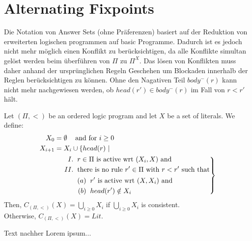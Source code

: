 \section{Alternating Fixpoints}

Die Notation von Answer Sets (ohne Präferenzen) basiert auf
der Reduktion von erweiterten logischen programmen auf basic Programme.
Dadurch ist es jedoch nicht mehr möglich einen Konflikt zu berücksichtigen,
da alle Konflikte simultan gelöst werden beim überführen von $\Pi$ zu $\Pi^X$.
Das lösen von Konflikten muss daher anhand der ursprünglichen Regeln Geschehen
um Blockaden innerhalb der Reglen berücksichtigen zu können.
Ohne den Nagativen Teil $body^-(r)$ kann nicht mehr nachgewiesen werden, ob
$head(r') \in body^-(r)$ im Fall von $r < r'$ hält.

\begin{definition}
  Let $(\Pi, <)$ be an ordered logic program and let $X$ be a set of literals.
  We define:\\
  \begin{equation*}
    \begin{split}
      X_0 & = \emptyset\hspace*{0.3cm} \text{~and for~} i \geq 0 \\
      X_{i+1} & = X_i \cup \{ head(r)~| \\
        & \hspace*{0.4cm}\left. \begin{aligned}
          I. &\hspace*{0.2cm} r \in \Pi \text{~is active wrt~} (X_i, X) \text{~and} \\
          II. &\hspace*{0.2cm} \text{there is no rule~} r' \in \Pi \text{~with~} r < r'
          \text{~such that} \\
          & \hspace*{0.2cm} \begin{aligned}
            (a) &\hspace*{0.2cm} r' \text{~is active wrt~} (X, X_i) \text{~and} \\
            (b) &\hspace*{0.2cm} head(r') \notin X_i
          \end{aligned}
        \end{aligned}
      \right \}
    \end{split}
  \end{equation*}
  Then, $C_{(\Pi, <)}(X) = \bigcup_{i\geq 0} X_i$ if $\bigcup_{i\geq 0} X_i$ is
  consistent. \\Otherwise, $C_{(\Pi, <)}(X) = Lit$.
\end{definition}

Text nachher Lorem ipsum...
